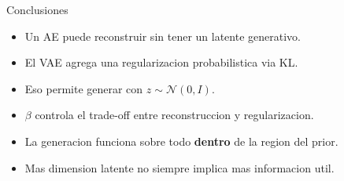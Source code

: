 \documentclass[aspectratio=169, 10pt]{beamer}
\begin{document}
\begin{frame}{Conclusiones}
  \begin{itemize}
    \item Un AE puede reconstruir sin tener un latente generativo.
    \item El VAE agrega una regularizacion probabilistica via KL.
    \item Eso permite generar con $z\sim\mathcal{N}(0,I)$.
    \item $\beta$ controla el trade-off entre reconstruccion y regularizacion.
    \item La generacion funciona sobre todo \textbf{dentro} de la region del prior.
    \item Mas dimension latente no siempre implica mas informacion util.
  \end{itemize}
\end{frame}
\end{document}
